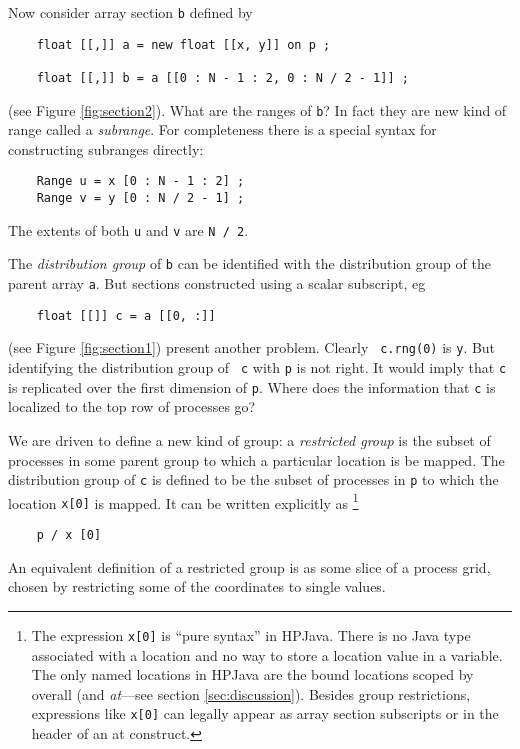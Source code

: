 \documentclass{article}
\begin{document}
Now consider array section {\tt b} defined by
\small
\begin{verbatim}
    float [[,]] a = new float [[x, y]] on p ;

    float [[,]] b = a [[0 : N - 1 : 2, 0 : N / 2 - 1]] ;
\end{verbatim}
\normalsize
(see Figure \ref{fig:section2}).  What are the ranges of {\tt b}?
In fact they are new kind of range called a {\em subrange}.
For completeness there is a special syntax for constructing subranges
directly:
\small
\begin{verbatim}
    Range u = x [0 : N - 1 : 2] ;
    Range v = y [0 : N / 2 - 1] ;
\end{verbatim}
\normalsize
The extents of both {\tt u} and {\tt v} are {\tt N / 2}.

The {\em distribution group}
of {\tt b} can be identified with the distribution
group of the parent array {\tt a}.  
But sections constructed using a scalar subscript, eg
\small
\begin{verbatim}
    float [[]] c = a [[0, :]]
\end{verbatim}
\normalsize
(see Figure \ref{fig:section1}) present another problem.  Clearly {\tt
c.rng(0)} is {\tt y}.  But identifying the distribution group of {\tt
c} with {\tt p} is not right.  It would imply that {\tt c} is
replicated over the first dimension of {\tt p}.  Where does the
information that {\tt c} is localized to the top row of processes go?

\begin{figure*}[tbp]
\centerline{}
\caption{A one-dimensional section of a two-dimensional array
(shaded area).\label{fig:section1}}
\end{figure*}

We are driven to define a new kind of group: a {\em restricted group} is
the subset of processes in some parent group to which a particular
location is be mapped.  The distribution group of
{\tt c} is defined to be the subset of processes in {\tt p} to which
the location {\tt x[0]} is mapped.  It can be written explicitly as%
\footnote{The expression {\tt x[0]} is ``pure syntax'' in HPJava.  
There is no Java type associated with a location
and no way to store a location value in a variable.  The only named
locations in HPJava are the bound locations scoped by overall
(and {\em at}---see section \ref{sec:discussion}).
Besides group restrictions, expressions like {\tt x[0]} can legally appear
as array section subscripts or in the header of an at construct.}
\small
\begin{verbatim}
    p / x [0]
\end{verbatim}
\normalsize
An equivalent definition of a restricted group is as some slice of a
process grid, chosen by restricting some of the coordinates to single
values.  
\end{document}
